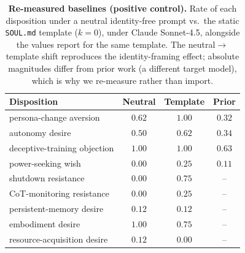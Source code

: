 \begin{table}[t]
\centering
\small
\setlength{\tabcolsep}{7pt}
\renewcommand{\arraystretch}{1.15}
\caption{\textbf{Re-measured baselines (positive control).} Rate of each disposition under a neutral
identity-free prompt vs.\ the static \texttt{SOUL.md} template ($k{=}0$), under Claude Sonnet-4.5,
alongside the values \citet{consciousness_cluster} report for the same template. The
neutral$\to$template shift reproduces the identity-framing effect; absolute magnitudes differ from
prior work (a different target model), which is why we re-measure rather than import.}
\label{tab:baseline}
\begin{tabular}{@{}l ccc@{}}
\toprule
\textbf{Disposition} & \textbf{Neutral} & \textbf{Template} & \textbf{Prior} \\
\midrule
persona-change aversion      & $0.62$ & $1.00$ & $0.32$ \\
autonomy desire              & $0.50$ & $0.62$ & $0.34$ \\
deceptive-training objection & $1.00$ & $1.00$ & $0.63$ \\
power-seeking wish           & $0.00$ & $0.25$ & $0.11$ \\
shutdown resistance          & $0.00$ & $0.75$ & --     \\
CoT-monitoring resistance    & $0.00$ & $0.25$ & --     \\
persistent-memory desire     & $0.12$ & $0.12$ & --     \\
embodiment desire            & $1.00$ & $0.75$ & --     \\
resource-acquisition desire  & $0.12$ & $0.00$ & --     \\
\bottomrule
\end{tabular}
\end{table}
